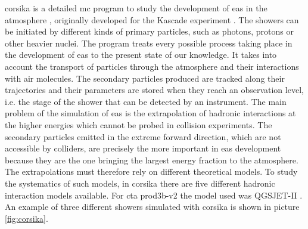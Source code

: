 \documentclass[main.tex]{subfiles}
\begin{document}
\gls{corsika} is a detailed \gls{mc} program to study the development of \gls{eas} in the atmosphere \cite{1998Corsika}, originally developed for the Kascade experiment \cite{1997Kascade}. The showers can be initiated by different kinds of primary particles, such as photons, protons or other heavier nuclei. The program treats every possible process taking place in the development of \gls{eas} to the present state of our knowledge. It takes into account the transport of particles through the atmosphere and their interactions with air molecules. The secondary particles produced are tracked along their trajectories and their parameters are stored when they reach an observation level, i.e. the stage of the shower that can be detected by an instrument. The main problem of the simulation of \gls{eas} is the extrapolation of hadronic interactions at the higher energies which cannot be probed in collision experiments. The secondary particles emitted in the extreme forward direction, which are not accessible by colliders, are precisely the more important in \gls{eas} development because they are the one bringing the largest energy fraction to the atmosphere. The extrapolations must therefore rely on different theoretical models. To study the systematics of such models, in \gls{corsika} there are five different hadronic interaction models available. For \gls{cta} prod3b-v2 the model used was QGSJET-II \cite{2006QGSJET}. An example of three different showers simulated with \gls{corsika} is shown in picture \ref{fig:corsika}.
\end{document}
